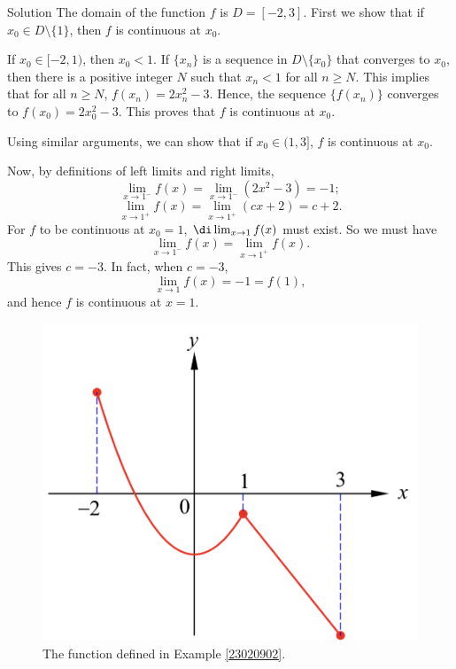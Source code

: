 \begin{solution}{Solution}
The domain of the function $f$ is $D=[-2, 3]$.
First we show that if $x_0\in D\setminus \{1\}$, then $f$ is continuous at $x_0$. 

If $x_0\in [-2, 1)$, then $x_0<1$. If $\{x_n\}$ is a sequence in $D\setminus\{x_0\}$ that converges to $x_0$, then there is a positive integer $N$ such that $x_n<1$ for all $n\geq N$. This implies that for all $n\geq N$, $f(x_n)=2x_n^2-3$. Hence, the sequence $\{f(x_n)\}$ converges to $f(x_0)=2x_0^2-3$. This proves that $f$ is continuous at $x_0$.

Using similar arguments, we can show that if $x_0\in (1, 3]$,  $f$ is continuous at $x_0$. \bs

Now, by definitions of left limits and right limits,
\[\lim_{x\rightarrow 1^-}f(x)=\lim_{x\rightarrow 1^-}(2x^2-3)=-1;\]
\[\lim_{x\rightarrow 1^+}f(x)=\lim_{x\rightarrow 1^+}(cx+2)=c+2.\]
For $f$ to be continuous at $x_0=1$, $\di\lim_{x\rightarrow 1}f(x)$ must exist. So we must have
\[\lim_{x\rightarrow 1^-}f(x)=\lim_{x\rightarrow 1^+}f(x).\]
This gives $c=-3$. 
In fact, 
when $c=-3$, 
\[\lim_{x\rightarrow 1}f(x)=-1=f(1),\]and hence $f$ is continuous at $x=1$.
\end{solution}


 \begin{figure}[ht]
\centering
\includegraphics[scale=0.2]{Picture10.png}
\caption{  The function defined in Example \ref{23020902}.}\label{figure10}
\end{figure}


